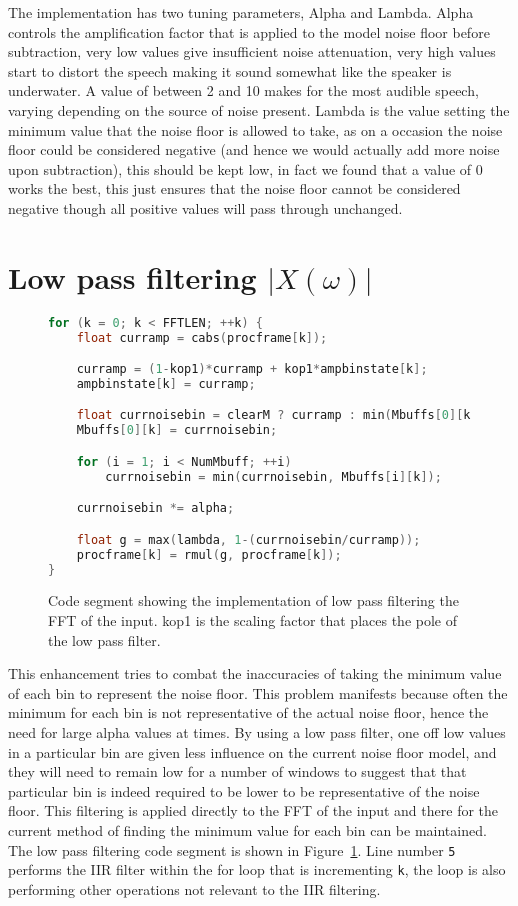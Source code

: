 \documentclass[11pt]{article} %
\begin{document}
The implementation has two tuning parameters, Alpha and Lambda. Alpha controls the amplification factor that is applied to the model noise floor before subtraction, very low values give insufficient noise attenuation, very high values start to distort the speech making it sound somewhat like the speaker is underwater. A value of between 2 and 10 makes for the most audible speech, varying depending on the source of noise present. 
Lambda is the value setting the minimum value that the noise floor is allowed to take, as on a occasion the noise floor could be considered negative (and hence we would actually add more noise upon subtraction), this should be kept low, in fact we found that a value of 0 works the best, this just ensures that the noise floor cannot be considered negative though all positive values will pass through unchanged.  

\section{Low pass filtering $\lvert X(\omega) \rvert $} 
\label{sec:IIRamp}
\begin{figure}[htbp]
	\begin{center}
    \begin{lstlisting}[language = C]
for (k = 0; k < FFTLEN; ++k) {
	float curramp = cabs(procframe[k]); 

	curramp = (1-kop1)*curramp + kop1*ampbinstate[k];
	ampbinstate[k] = curramp;

	float currnoisebin = clearM ? curramp : min(Mbuffs[0][k], curramp);
	Mbuffs[0][k] = currnoisebin;

	for (i = 1; i < NumMbuff; ++i)
		currnoisebin = min(currnoisebin, Mbuffs[i][k]);

	currnoisebin *= alpha;

	float g = max(lambda, 1-(currnoisebin/curramp));
	procframe[k] = rmul(g, procframe[k]);
}
    \end{lstlisting}
  \end{center}
	\caption{Code segment showing the implementation of low pass filtering the FFT of the input. kop1 is the scaling factor that places the pole of the low pass filter.}
	\label{code:LPFxOMG}
\end{figure}

This enhancement tries to combat the inaccuracies of taking the minimum value of each bin to represent the noise floor. This problem manifests because often the minimum for each bin is not representative of the actual noise floor, hence the need for large alpha values at times. By using a low pass filter, one off low values in a particular bin are given less influence on the current noise floor model, and they will need to remain low for a number of windows to suggest that that particular bin is indeed required to be lower to be representative of the noise floor. This filtering is applied directly to the FFT of the input and there for the current method of finding the minimum value for each bin can be maintained. The low pass filtering code segment is shown in Figure~\ref{code:LPFxOMG}.  Line number \verb"5" performs the IIR filter within the for loop that is incrementing \verb"k", the loop is also performing other operations not relevant to the IIR filtering. 
\end{document}
